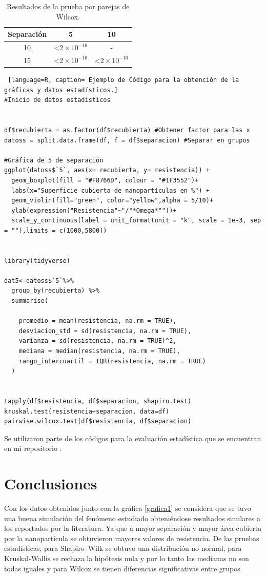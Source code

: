 \documentclass{elsarticle}
\begin{document}
\begin{table}[h!]
\centering
\caption{Resultados de la prueba por parejas de Wilcox.}
\label{tabla8}
\begin{tabular}{|c|r|c|}
\hline
Separación & \multicolumn{1}{c|}{5} & 10 \\ \hline
10 & \textless{}$2\times 10^{-16}$ & - \\ \hline
15 & \textless{}$2\times 10^{-16}$ & \multicolumn{1}{r|}{\textless{}$2\times 10^{-16}$} \\ \hline
\end{tabular}
\end{table}

\begin{lstlisting} [language=R, caption= Ejemplo de Código para la obtención de la gráficas y datos estadísticos.] 
#Inicio de datos estadísticos


df$recubierta = as.factor(df$recubierta) #Obtener factor para las x
datoss = split.data.frame(df, f = df$separacion) #Separar en grupos

#Gráfica de 5 de separación
ggplot(datoss$`5`, aes(x= recubierta, y= resistencia)) + 
  geom_boxplot(fill = "#F8766D", colour = "#1F3552")+ 
  labs(x="Superficie cubierta de nanopartículas en %") +
  geom_violin(fill="green", color="yellow",alpha = 5/10)+
  ylab(expression("Resistencia"~"/"*Omega*""))+
  scale_y_continuous(label = unit_format(unit = "k", scale = 1e-3, sep = ""),limits = c(1000,5800))

  
library(tidyverse)

dat5<-datoss$`5`%>%
  group_by(recubierta) %>%
  summarise(
    
    promedio = mean(resistencia, na.rm = TRUE),
    desviacion_std = sd(resistencia, na.rm = TRUE),
    varianza = sd(resistencia, na.rm = TRUE)^2,
    mediana = median(resistencia, na.rm = TRUE),
    rango_intercuartil = IQR(resistencia, na.rm = TRUE)
  )


tapply(df$resistencia, df$separacion, shapiro.test)
kruskal.test(resistencia~separacion, data=df)
pairwise.wilcox.test(df$resistencia, df$separacion)

\end{lstlisting}
Se utilizaron parte de los códigos para la evaluación estadística que se encuentran en mi repositorio \cite{eduartilon}.


\section{Conclusiones}
Con los datos obtenidos junto con la gráfica \ref{grafica1} se considera que se tuvo una buena simulación del fenómeno estudiado obteniéndose resultados similares a los reportados por la literatura. Ya que a mayor separación y mayor área cubierta por la nanopartícula se obtuvieron mayores valores de resistencia. De las pruebas estadísticas, para Shapiro–Wilk se obtuvo una distribución no normal, para Kruskal-Wallis se rechaza la hipótesis nula y por lo tanto las medianas no son todas iguales y para Wilcox se tienen diferencias significativas entre grupos.
\end{document}
